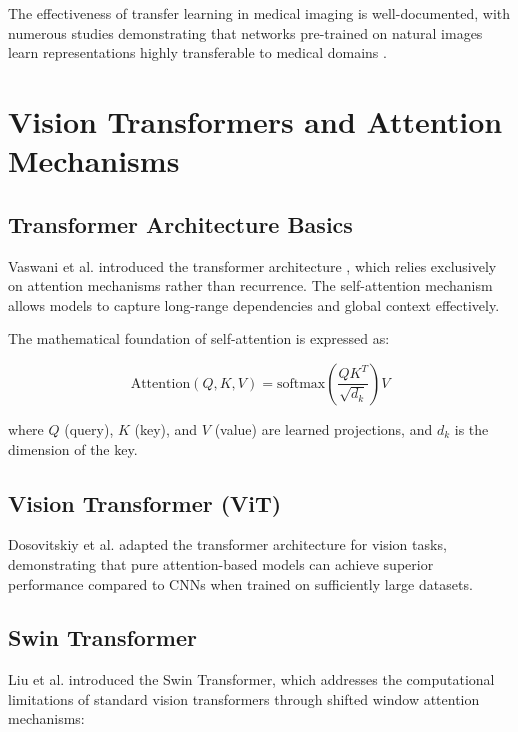The effectiveness of transfer learning in medical imaging is well-documented, with numerous studies demonstrating that networks pre-trained on natural images learn representations highly transferable to medical domains \cite{tajbakhsh2016convolutional}.

\section{Vision Transformers and Attention Mechanisms}

\subsection{Transformer Architecture Basics}

Vaswani et al. introduced the transformer architecture \cite{vaswani2017attention}, which relies exclusively on attention mechanisms rather than recurrence. The self-attention mechanism allows models to capture long-range dependencies and global context effectively.

The mathematical foundation of self-attention is expressed as:

\begin{equation}
\text{Attention}(Q, K, V) = \text{softmax}\left(\frac{QK^T}{\sqrt{d_k}}\right)V
\end{equation}

where $Q$ (query), $K$ (key), and $V$ (value) are learned projections, and $d_k$ is the dimension of the key.

\subsection{Vision Transformer (ViT)}

Dosovitskiy et al. \cite{dosovitskiy2020image} adapted the transformer architecture for vision tasks, demonstrating that pure attention-based models can achieve superior performance compared to CNNs when trained on sufficiently large datasets.

\subsection{Swin Transformer}

Liu et al. \cite{liu2021swin} introduced the Swin Transformer, which addresses the computational limitations of standard vision transformers through shifted window attention mechanisms:

